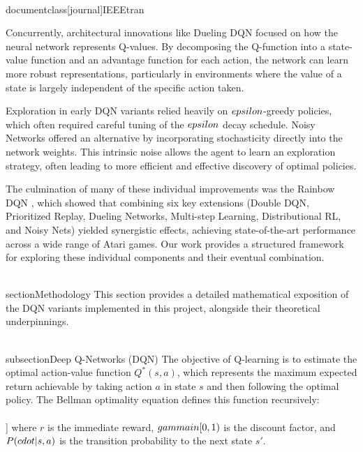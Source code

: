 \\documentclass[journal]{IEEEtran}
\begin{document}
Concurrently, architectural innovations like Dueling DQN \cite{wang2016dueling} focused on how the neural network represents Q-values. By decomposing the Q-function into a state-value function and an advantage function for each action, the network can learn more robust representations, particularly in environments where the value of a state is largely independent of the specific action taken.

Exploration in early DQN variants relied heavily on $\\epsilon$-greedy policies, which often required careful tuning of the $\\epsilon$ decay schedule. Noisy Networks \cite{fortunato2017noisy} offered an alternative by incorporating stochasticity directly into the network weights. This intrinsic noise allows the agent to learn an exploration strategy, often leading to more efficient and effective discovery of optimal policies.

The culmination of many of these individual improvements was the Rainbow DQN \cite{hessel2017rainbow}, which showed that combining six key extensions (Double DQN, Prioritized Replay, Dueling Networks, Multi-step Learning, Distributional RL, and Noisy Nets) yielded synergistic effects, achieving state-of-the-art performance across a wide range of Atari games. Our work provides a structured framework for exploring these individual components and their eventual combination.

\\section{Methodology}
This section provides a detailed mathematical exposition of the DQN variants implemented in this project, alongside their theoretical underpinnings.

\\subsection{Deep Q-Networks (DQN)}
The objective of Q-learning is to estimate the optimal action-value function $Q^*(s, a)$, which represents the maximum expected return achievable by taking action $a$ in state $s$ and then following the optimal policy. The Bellman optimality equation defines this function recursively:
\\[
Q^*(s, a) = \\mathbb{E}_{s\' \\sim P(\\cdot|s,a)} \\left[ r + \\gamma \\max_{a\'} Q^*(s\', a\') \\right]
\\]
where $r$ is the immediate reward, $\\gamma \\in [0, 1)$ is the discount factor, and $P(\\cdot|s,a)$ is the transition probability to the next state $s'$.
\end{document}
